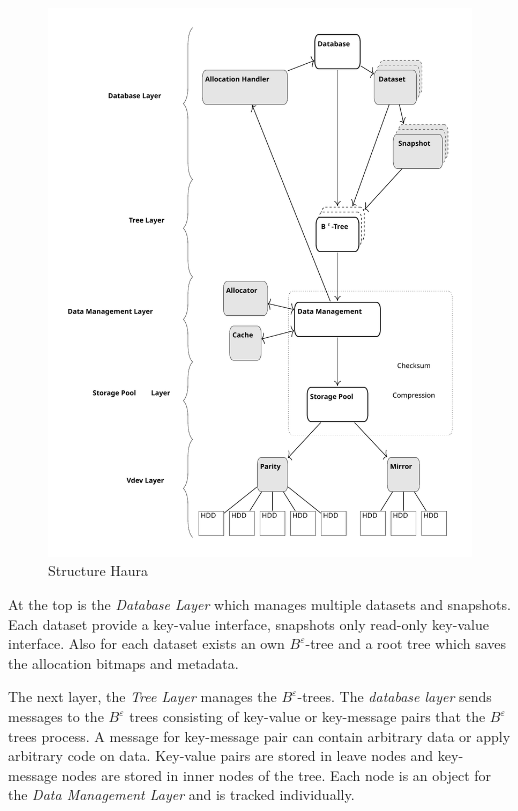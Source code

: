 \documentclass[
	12pt,
	a4paper,
	abstract,
	bibliography=totoc,
	chapterprefix,
	headings=openright,
	numbers=endperiod,
	parskip=half,
	twoside,
]{scrreprt}
\begin{document}
\begin{figure}[ht]
	\centering
	\includegraphics[scale=0.4]{overview_haura_level.pdf}
	\caption{Structure Haura \cite{wiedemann2018modern}}
		\label{fig:structure Haura}
\end{figure}


At the top is the \emph{Database Layer} which manages multiple datasets and snapshots. Each dataset provide a key-value interface, snapshots only read-only key-value interface. Also for each dataset exists an own $B^{\varepsilon}$-tree and  a root tree which saves the allocation bitmaps and metadata.

The next layer, the \emph{Tree Layer} manages the $B^{\varepsilon}$-trees.
The \emph{database layer} sends messages to the $B^{\varepsilon}$ trees consisting of key-value or key-message pairs that the $B^{\varepsilon}$ trees process. A message for key-message pair can contain arbitrary data or apply arbitrary code on data.
Key-value pairs are stored in leave nodes and key-message nodes are stored in inner nodes of the tree.
Each node is an object for the \emph{Data Management Layer} and is tracked individually.
\end{document}
